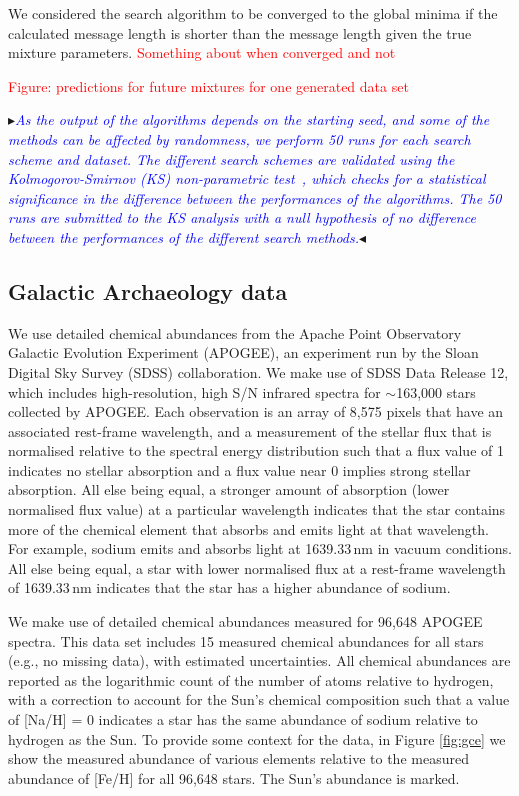 \documentclass{elsarticle}
\newcommand{\todo}[1]{\textcolor{red}{#1}}
\newcommand{\nbb}[2]{
    \fcolorbox{black}{cyan}{\bfseries\sffamily\scriptsize#1}
    {\sf$\blacktriangleright$\textcolor{blue}{\textit{#2}}$\blacktriangleleft$}
}
\newcommand{\andy}[1]{\nbb{Andy}{#1}}
\begin{document}
We considered the search algorithm to be converged to the global minima if the calculated message length is shorter than the message length given the true mixture parameters. \todo{Something about when converged and not}

\todo{Figure: predictions for future mixtures for one generated data set}



\andy{As the output of the algorithms depends on the starting seed, and some of the methods can be affected by randomness, we perform 50 runs for each search scheme and dataset.  The different search schemes are validated using the Kolmogorov-Smirnov (KS) non-parametric test~\citep{Pettitt77S}, which checks for a statistical significance in the difference between the performances of the algorithms. The 50 runs are submitted to the KS analysis with a null hypothesis of no difference between the performances of the different search methods.}


\subsection{Galactic Archaeology data}

We use detailed chemical abundances from the Apache Point Observatory Galactic Evolution Experiment (APOGEE), an experiment run by the Sloan Digital Sky Survey (SDSS) collaboration. We make use of SDSS Data Release 12, which includes high-resolution, high S/N infrared spectra for $\sim$163,000 stars collected by APOGEE. Each observation
is an array of 8,575 pixels that have an associated rest-frame wavelength, and a
measurement of the stellar flux that is normalised relative to the spectral energy
distribution such that a flux value of 1 indicates no stellar absorption and a
flux value near 0 implies strong stellar absorption. All else being equal, a stronger
amount of absorption (lower normalised flux value) at a particular wavelength 
indicates that the star contains more of the chemical element that absorbs and
emits light at that wavelength. For example, sodium emits and absorbs light 
at 1639.33\,nm in vacuum conditions. All else being
equal, a star with lower normalised flux at a rest-frame wavelength of 1639.33\,nm
indicates that the star has a higher abundance of sodium.

We make use of detailed chemical abundances measured for 96,648 APOGEE spectra\citep{Casey:2016}.
This data set includes 15 measured chemical abundances
for all stars (e.g., no missing data), with estimated uncertainties. All chemical
abundances are reported as the logarithmic count of the number of atoms relative
to hydrogen, with a correction to account for the Sun's chemical composition such
that a value of [Na/H] = 0 indicates a star has the same abundance of sodium relative to
hydrogen as the Sun. To provide some context for the data, in Figure \ref{fig:gce} 
we show the measured abundance of various elements relative to the measured abundance
of [Fe/H] for all 96,648 stars. The Sun's abundance is marked.
\end{document}
